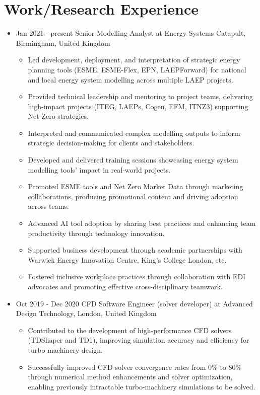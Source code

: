 \documentclass[letterpaper]{article}
\begin{document}
\section*{Work/Research Experience}
\begin{itemize}
\item Jan 2021 - present \hspace{2pt} Senior Modelling Analyst at Energy Systems Catapult, Birmingham, United Kingdom
  \begin{itemize}
    \item Led development, deployment, and interpretation of strategic energy planning tools (ESME, ESME-Flex, EPN, LAEPForward) for national and local energy system modelling across multiple LAEP projects.
    \item Provided technical leadership and mentoring to project teams, delivering high-impact projects (ITEG, LAEPs, Cogen, EFM, ITNZ3) supporting Net Zero strategies.
    \item Interpreted and communicated complex modelling outputs to inform strategic decision-making for clients and stakeholders.
    \item Developed and delivered training sessions showcasing energy system modelling tools' impact in real-world projects.
    \item Promoted ESME tools and Net Zero Market Data through marketing collaborations, producing promotional content and driving adoption across teams.
    \item Advanced AI tool adoption by sharing best practices and enhancing team productivity through technology innovation.
    \item Supported business development through academic partnerships with Warwick Energy Innovation Centre, King's College London, etc.
    \item Fostered inclusive workplace practices through collaboration with EDI advocates and promoting effective cross-disciplinary teamwork.
  \end{itemize}
\item Oct 2019 - Dec 2020 \hspace{2pt} CFD Software Engineer (solver developer) at Advanced Design Technology, London, United Kingdom
   \begin{itemize}
   \item Contributed to the development of high-performance CFD solvers (TDShaper and TD1), improving simulation accuracy and efficiency for turbo-machinery design.
   \item Successfully improved CFD solver convergence rates from 0\% to 80\% through numerical method enhancements and solver optimization, enabling previously intractable turbo-machinery simulations to be solved.

\end{itemize}
\end{itemize}
\end{document}
